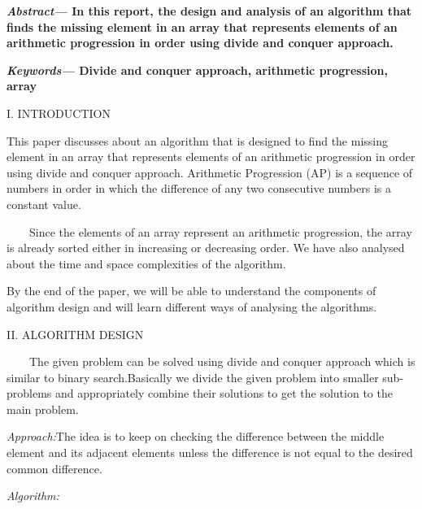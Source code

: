 \documentclass[12pt,a4paper]{article}
\begin{document}
\begin{multicols}{2}
\textbf{\textit{Abstract--- }In this report, the design and analysis of an algorithm that finds the missing element in an array that represents elements of an arithmetic progression in order using divide and conquer approach.}

\textbf{\textit{Keywords--- }Divide and conquer approach, arithmetic progression, array }

\begin{center}I. INTRODUCTION\end{center}

This paper discusses about an algorithm that is  designed to  find the missing element in an array that represents elements of an arithmetic progression in order using divide and conquer approach. Arithmetic Progression (AP) is a sequence of numbers in order in which the difference of any two consecutive numbers is a constant value. 

\ \ \ \ Since the elements of an array represent an arithmetic progression, the array is already sorted either in increasing or decreasing order.  We have also analysed about the time and 
space complexities of the algorithm.  

By the end of the paper, we will be able to understand the components of 
algorithm design and will learn different ways of analysing the 
algorithms. 

\begin{center}II. ALGORITHM DESIGN\end{center}

\ \ \ \ The given problem can be solved using divide and conquer approach which is similar to binary search.Basically we divide the given problem into smaller sub-problems and appropriately combine their solutions to get the solution to the main problem.  


\textit{  Approach:}The idea is to keep on checking the difference between the middle element and its adjacent elements unless the difference is not equal to the desired common difference.


\textit{  Algorithm:}


\end{multicols}
\end{document}
